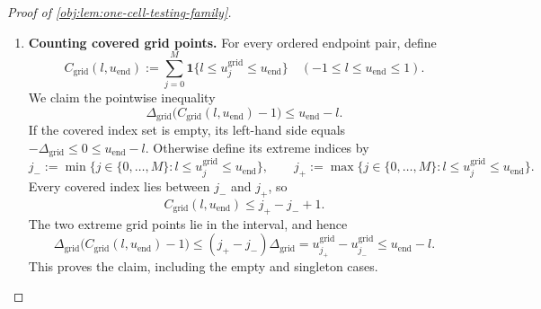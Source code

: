 \documentclass[11pt]{article}
\begin{document}
\begin{proof}[Proof of \cref{obj:lem:one-cell-testing-family}]
\begin{enumerate}
For the comparison with the reference sample law, define
\[
\xi_j:=2N(j\Delta_{\mathrm{grid}})^2
\quad(j=0,\ldots,M).
\]
The width budget implies
\[
0\le\xi_j
\le2Nw_{\mathrm{grid}}^2
\le\frac{\varepsilon_\alpha^2}{8}
\le\frac18<1.
\]
The one-record identity and product calculation give
\[
\chi^2\!\left(
 \mathbb Q_{u_j^{\mathrm{grid}}}\Vert\mathbb Q_{1/2}
 \right)
\le e^{\xi_j}-1.
\]
For \(0\le\xi_j<1\), use the exponential bound
\(e^{\xi_j}\le(1-\xi_j)^{-1}\). Furthermore,
\[
\xi_j(1+\varepsilon_\alpha^2)
\le2\xi_j
\le\frac{\varepsilon_\alpha^2}{4}
\le\varepsilon_\alpha^2.
\]
Since \(1-\xi_j>0\), this implies
\[
e^{\xi_j}-1
\le\frac1{1-\xi_j}-1
=\frac{\xi_j}{1-\xi_j}
\le\varepsilon_\alpha^2.
\]
Consequently,
\[
\operatorname{TV}
 \bigl(\mathbb Q_{1/2},
       \mathbb Q_{u_j^{\mathrm{grid}}}\bigr)
\le
\frac12
\sqrt{\chi^2\!\left(
 \mathbb Q_{u_j^{\mathrm{grid}}}\Vert\mathbb Q_{1/2}
 \right)}
\le\frac{\varepsilon_\alpha}{2}
\le\varepsilon_\alpha.
\]
Applying \cref{obj:lem:randomized-kernel-tv-comparison} to the common interval kernel yields
\[
\operatorname{TV}(\mu_{\mathrm{ref}},\mu_j)
\le\varepsilon_\alpha.
\]
Thus, by the defining event bound for total variation,
\[
\mu_{\mathrm{ref}}(B_j)
\ge\mu_j(B_j)-\varepsilon_\alpha
\ge\beta_\alpha-\varepsilon_\alpha
=\frac{7\beta_\alpha}{8}.
\]

\item \textbf{Counting covered grid points.}
For every ordered endpoint pair, define
\[
C_{\mathrm{grid}}(l,u_{\mathrm{end}})
:=
\sum_{j=0}^{M}
\mathbf1\{l\le u_j^{\mathrm{grid}}\le u_{\mathrm{end}}\}
\quad(-1\le l\le u_{\mathrm{end}}\le1).
\]
We claim the pointwise inequality
\[
\Delta_{\mathrm{grid}}
\bigl(C_{\mathrm{grid}}(l,u_{\mathrm{end}})-1\bigr)
\le u_{\mathrm{end}}-l.
\]
If the covered index set is empty, its left-hand side equals
\(-\Delta_{\mathrm{grid}}\le0\le u_{\mathrm{end}}-l\). Otherwise define its extreme indices by
\[
j_-:=\min\{j\in\{0,\ldots,M\}:
                 l\le u_j^{\mathrm{grid}}\le u_{\mathrm{end}}\},
\qquad
j_+:=\max\{j\in\{0,\ldots,M\}:
                 l\le u_j^{\mathrm{grid}}\le u_{\mathrm{end}}\}.
\]
Every covered index lies between \(j_-\) and \(j_+\), so
\[
C_{\mathrm{grid}}(l,u_{\mathrm{end}})\le j_+-j_-+1.
\]
The two extreme grid points lie in the interval, and hence
\[
\Delta_{\mathrm{grid}}
 \bigl(C_{\mathrm{grid}}(l,u_{\mathrm{end}})-1\bigr)
\le
(j_+-j_-)\Delta_{\mathrm{grid}}
=
u_{j_+}^{\mathrm{grid}}-u_{j_-}^{\mathrm{grid}}
\le u_{\mathrm{end}}-l.
\]
This proves the claim, including the empty and singleton cases.


\end{enumerate}
\end{proof}
\end{document}
